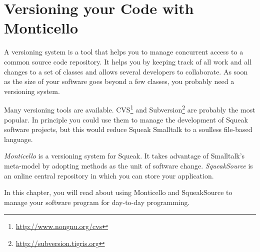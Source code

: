 \documentclass[a4paper,10pt,twoside]{book}
\begin{document}
	\sloppy
\fi

\newcommand{\figlabel}[1]{\label{fig:#1}}
\newcommand{\seclabel}[1]{\label{sec:#1}}

\chapter{Versioning your Code with Monticello}




A versioning system is a tool that helps you to manage concurrent access to a common source code repository. It helps you by keeping track of all work and all changes to a set of classes and allows several developers to collaborate. As soon as the size of your software goes beyond a few classes, you probably need a versioning system.

Many versioning tools are available. CVS\footnote{\url{http://www.nongnu.org/cvs}} and Subversion\footnote{\url{http://subversion.tigris.org}} are probably the most popular.
In principle you could use them to manage the development of Squeak software projects, but this would reduce Squeak Smalltalk to a soulless file-based language. 

\emph{Monticello} is a versioning system for Squeak. It takes advantage of Smalltalk's meta-model by adopting methods as the unit of software change. \emph{SqueakSource} is an online central repository in which you can store your application.

In this chapter, you will read about using Monticello and SqueakSource to manage your software program for day-to-day programming.

\end{document}
